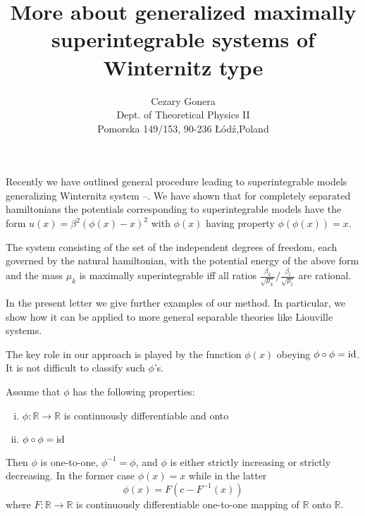 \documentclass[a4paper,12pt]{article}
\author{Cezary Gonera\\
Dept. of Theoretical Physics II\\
Pomorska 149/153, 90-236 \L{}\'od\'z,Poland}
\title{More about generalized maximally superintegrable systems of Winternitz type}
\newcommand{\mId}{\mbox{\rm id}}
\newcommand{\mR}{{\mathbb R}}
\begin{document}
\maketitle
{}
\vspace{0.5cm}


Recently we have outlined  \cite{1} 
general procedure leading to superintegrable models generalizing Winternitz 
system \cite{1}--\cite{6}. 
We have shown that for completely separated hamiltonians the potentials corresponding to 
superintegrable models have the form $u(x)=\beta^2(\phi(x)-x)^2$ with $\phi(x)$ having property 
$\phi(\phi(x))=x$. 

The system consisting of the set of the independent degrees of freedom, each
governed by the natural hamiltonian, with the potential energy of the above form  and the mass $\mu_k$ is
maximally superintegrable iff all ratios $\frac{\beta_k}{\sqrt{\mu_k}}/\frac{\beta_l}{\sqrt{\mu_l}}$
are rational.

In the present letter we give further examples of our method. In particular, we show how it
 can be applied to more general separable theories like Liouville systems.

The key role in our approach is played by the function $\phi(x)$ obeying $\phi\circ\phi=\mId$. 
It is not difficult to classify such $\phi$'s.

Assume that $\phi$ has the following properties:
\begin{enumerate}[i)]
\item $\phi:\mR\rightarrow\mR$ is continuously differentiable and onto
\item $\phi\circ\phi=\mId$
\end{enumerate}
Then $\phi$ is one-to-one, $\phi^{-1}=\phi$, and  $\phi$ is either strictly increasing or strictly 
decreasing. In the former case $\phi(x)=x$ while in the latter
\begin{equation}
\phi(x)=F(c-F^{-1}(x))
\label{w1}
\end{equation}
where $F:\mR\rightarrow\mR$ is continuously differentiable one-to-one mapping of $\mR$ onto $\mR$.
\end{document}
